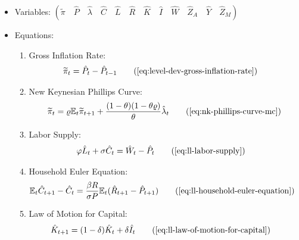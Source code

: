\documentclass[
thesis.tex
]{subfiles}
\begin{document}
	{\singlespacing
		
		\begin{itemize}
			
			\item Variables: \( \left( \tilde{\pi} \quad \hat{P} \quad \hat{\lambda} \quad \hat{C} \quad \hat{L} \quad \hat{R} \quad \hat{K} \quad \hat{I} \quad \hat{W} \quad \hat{Z}_A \quad \hat{Y} \quad \hat{Z}_M \right) \)
			
			\item Equations:
			
			\begin{enumerate}
				
				\item Gross Inflation Rate:
				\begin{align}
					\widetilde{\pi}_t &= \hat{P}_t - \hat{P}_{t-1}
					\tag{\ref{eq:level-dev-gross-inflation-rate}}
				\end{align}
				
				\item New Keynesian Phillips Curve:
				\begin{align}
					\widetilde{\pi}_t = \varrho \E \widetilde{\pi}_{t+1} + \frac{(1-\theta) (1- \theta \varrho)}{\theta} \hat{\lambda}_t
					\tag{\ref{eq:nk-phillips-curve-mc}}
				\end{align}
				
				\item Labor Supply:
				\begin{align}
					\varphi \hat{L}_t + \sigma \hat{C}_t &= \hat{W}_t - \hat{P}_t
					\tag{\ref{eq:ll-labor-supply}}
				\end{align}
				
				\item Household Euler Equation:
				\begin{align}
					\E \hat{C}_{t+1} - \hat{C}_t &= \frac{\beta R}{\sigma P} \E(\hat{R}_{t+1} - \hat{P}_{t+1})
					\tag{\ref{eq:ll-household-euler-equation}}
				\end{align}
				
				\item Law of Motion for Capital:
				\begin{align}
					\hat{K}_{t+1} &= (1-\delta)\hat{K}_t + \delta \hat{I}_t
					\tag{\ref{eq:ll-law-of-motion-for-capital}}
				\end{align}
				
				

\end{enumerate}
\end{itemize}}
\end{document}
